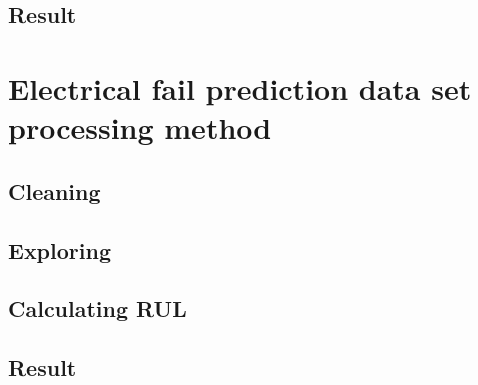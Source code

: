 \subsection{Result}
\section{Electrical fail prediction data set processing method}
	\subsection{Cleaning}
	\subsection{Exploring}
	\subsection{Calculating RUL}
	\subsection{Result}